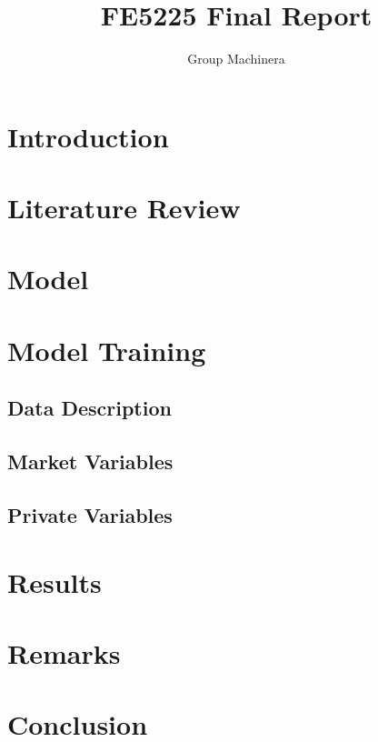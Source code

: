 \documentclass[12pt]{extarticle}
\title{FE5225 Final Report}
\author{Group Machinera}
\begin{document}
\maketitle

\section{Introduction}

\section{Literature Review}



\section{Model}
\section{Model Training}
\subsection{Data Description}

\subsection{Market Variables}

\subsection{Private Variables}

\section{Results}

\section{Remarks}

\section{Conclusion}
\end{document}
